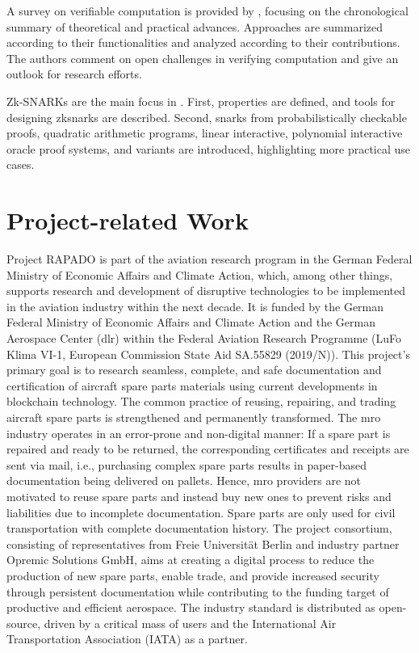 A survey on verifiable computation is provided by \citet{Ahmad}, focusing on the chronological summary of theoretical and practical advances. Approaches are summarized according to their functionalities and analyzed according to their contributions. The authors comment on open challenges in verifying computation and give an outlook for research efforts. 

Zk-SNARKs are the main focus in \citet{NitulescuGentleIntroSNARKs}. First, properties are defined, and tools for designing \acrshort{zksnark}s are described. Second, \acrshort{snark}s from probabilistically checkable proofs, quadratic arithmetic programs, linear interactive, polynomial interactive oracle proof systems, and variants are introduced, highlighting more practical use cases. 

\section{Project-related Work}

Project RAPADO is part of the aviation research program in the German Federal Ministry of Economic Affairs and Climate Action, which, among other things, supports research and development of disruptive technologies to be implemented in the aviation industry within the next decade. It is funded by the German Federal Ministry of Economic Affairs and Climate Action and the German Aerospace Center (\acrshort{dlr}) within the Federal Aviation Research Programme (LuFo Klima VI-1, European Commission State Aid SA.55829 (2019/N)). This project's primary goal is to research seamless, complete, and safe documentation and certification of aircraft spare parts materials using current developments in blockchain technology. The common practice of reusing, repairing, and trading aircraft spare parts is strengthened and permanently transformed. The \acrshort{mro} industry operates in an error-prone and non-digital manner: If a spare part is repaired and ready to be returned, the corresponding certificates and receipts are sent via mail, i.e., purchasing complex spare parts results in paper-based documentation being delivered on pallets. Hence, \acrshort{mro} providers are not motivated to reuse spare parts and instead buy new ones to prevent risks and liabilities due to incomplete documentation. Spare parts are only used for civil transportation with complete documentation history. The project consortium, consisting of representatives from Freie Universit{\"a}t Berlin and industry partner Opremic Solutions GmbH, aims at creating a digital process to reduce the production of new spare parts, enable trade, and provide increased security through persistent documentation while contributing to the funding target of productive and efficient aerospace. The industry standard is distributed as open-source, driven by a critical mass of users and the International Air Transportation Association (IATA) as a partner.

